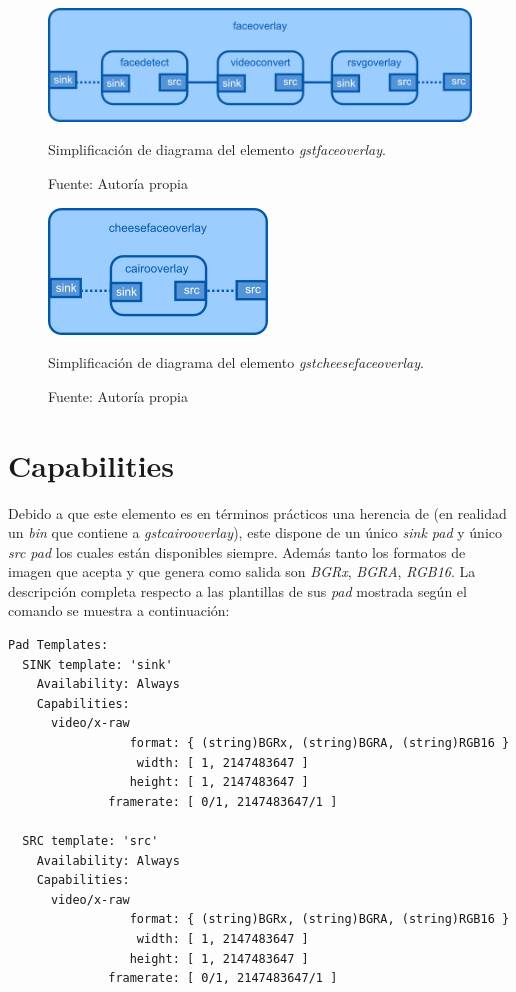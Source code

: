 \documentclass[a4paper,openright,12pt]{report}
\begin{document}
\begin{figure}[!h]
  \centering
    \includegraphics[width=1.0\textwidth]{../images/faceoverlay-design.png}\par
  \caption{Simplificación de diagrama del elemento \textit{gstfaceoverlay}.}
    \label{fig:faceoverlay-design}
  \caption*{Fuente: Autoría propia}
\end{figure}

\begin{figure}[!h]
  \centering
    \includegraphics{../images/cheesefaceoverlay-design.png}\par
  \caption{Simplificación de diagrama del elemento \textit{gstcheesefaceoverlay}.}
    \label{fig:cheesefaceoverlay-design}
  \caption*{Fuente: Autoría propia}
\end{figure}

\section{Capabilities}
Debido a que este elemento es en términos prácticos una herencia de (en realidad
un \textit{bin} que contiene a \textit{gstcairooverlay}), este dispone de
un único \textit{sink pad} y único \textit{src pad} los cuales están disponibles
siempre. Además tanto los formatos de imagen que acepta y que genera como salida
son \textit{BGRx}, \textit{BGRA}, \textit{RGB16}. La descripción completa
respecto a las plantillas de sus \textit{pad} mostrada según el comando
 se muestra a continuación:

\begin{verbatim}
Pad Templates:
  SINK template: 'sink'
    Availability: Always
    Capabilities:
      video/x-raw
                 format: { (string)BGRx, (string)BGRA, (string)RGB16 }
                  width: [ 1, 2147483647 ]
                 height: [ 1, 2147483647 ]
              framerate: [ 0/1, 2147483647/1 ]
  
  SRC template: 'src'
    Availability: Always
    Capabilities:
      video/x-raw
                 format: { (string)BGRx, (string)BGRA, (string)RGB16 }
                  width: [ 1, 2147483647 ]
                 height: [ 1, 2147483647 ]
              framerate: [ 0/1, 2147483647/1 ]
\end{verbatim}
\end{document}
